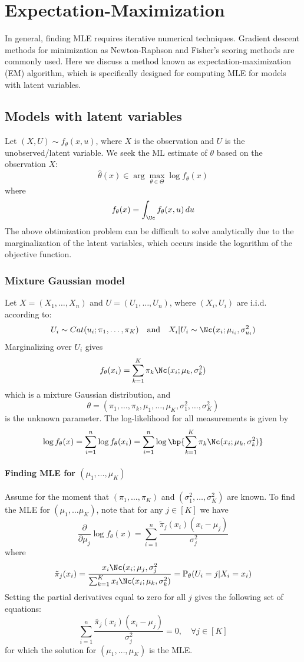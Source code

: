 \chapter{Expectation-Maximization}

In general, finding MLE requires iterative numerical techniques. Gradient descent methods for
minimization as Newton-Raphson and Fisher's scoring methods are commonly used. Here we discuss a method known as
expectation-maximization (EM) algorithm, which is specifically designed for computing MLE for models with latent variables.
\section{Models with latent variables}
Let $(X,U) \sim f_\theta(x, u)$, where $X$ is the observation and $U$ is the unobserved/latent variable. We seek the ML estimate of $\theta$ based on the observation $X$:
\[
    \hat{\theta}(x) \in \arg\max_{\theta\in\Theta} \log f_\theta(x)
\]
where
\[
    f_\theta(x) = \int_{\Uc} f_\theta(x, u) \, du
\]
The above obtimization problem can be difficult to solve analytically due to the marginalization of the latent variables,
which occurs inside the logarithm of the objective function.
\subsection{Mixture Gaussian model}
Let $X = (X_1, \dots, X_n)$ and $U = (U_1, \dots, U_n)$, where $(X_i, U_i)$ are i.i.d. according to:
\[
    U_i \sim Cat(u_i; \pi_1, \dots, \pi_K) \quad\text{and}\quad X_i|U_i \sim \Nc(x_i; \mu_{i_i}, \sigma_{u_i}^2)
\]
Marginalizing over $U_i$ gives
\[
    f_\theta(x_i) = \sum_{k=1}^K \pi_k \Nc(x_i; \mu_k, \sigma_k^2)
\]
which is a mixture Gaussian distribution, and
\[
    \theta = (\pi_1, \dots, \pi_k, \mu_1, \dots, \mu_K, \sigma_1^2, \dots, \sigma_K^2)
\]
is the unknown parameter. The log-likelihood for all measurements is given by
\[
    \log f_\theta(x) = \sum_{i=1}^n \log f_\theta(x_i) = \sum_{i=1}^n \log \bp{\sum_{k=1}^K \pi_k \Nc (x_i; \mu_k, \sigma_k^2)}
\]
\subsubsection{Finding MLE for $(\mu_1, \dots, \mu_K)$}
Assume for the moment that $(\pi_1, \dots, \pi_K)$ and $(\sigma_1^2, \dots, \sigma_K^2)$ are known. To find the MLE
for $(\mu_1, \dots \mu_K)$, note that for any $j \in [K]$ we have
\[
    \frac{\partial}{\partial \mu_j} \log f_\theta(x) = \sum_{i=1}^n \frac{\tilde{\pi}_j(x_i)(x_i - \mu_j)}{\sigma_j^2}
\]
where
\[
    \tilde{\pi}_j (x_i) = \frac{x_i \Nc(x_i; \mu_j, \sigma_j^2}{\sum_{k=1}^K x_i \Nc (x_i; \mu_k, \sigma_k^2)} = \mathbb{P}_\theta(U_i = j | X_i = x_i)
\]
Setting the partial derivatives equal to zero for all $j$ gives the following set of equations:
\[
    \sum_{i=1}^n \frac{\tilde{\pi_j}(x_i)(x_i - \mu_j)}{\sigma_j^2} = 0, \quad\forall j\in[K]
\]
for which the solution for $(\mu_1, \dots, \mu_K)$ is the MLE.
